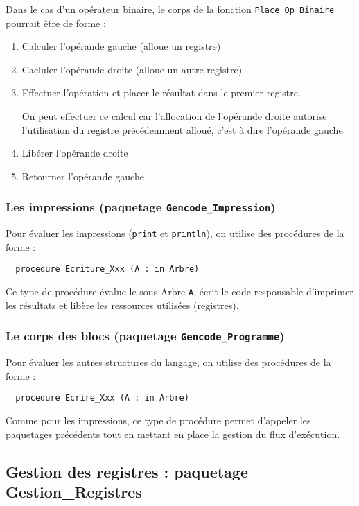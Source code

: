 Dans le cas d'un opérateur binaire, le corps de la fonction \verb!Place_Op_Binaire! pourrait être de forme :
\begin{enumerate}
\item Calculer l'opérande gauche (alloue un registre)
\item Cacluler l'opérande droite (alloue un autre registre)
\item Effectuer l'opération et placer le résultat dans le premier registre.

  On peut effectuer ce calcul car l'allocation de l'opérande droite autorise l'utilisation du registre précédemment alloué, c'est à dire l'opérande gauche.
\item Libérer l'opérande droite
\item Retourner l'opérande gauche
\end{enumerate}


\subsubsection{Les impressions (paquetage \texttt{Gencode\_Impression})}

Pour évaluer les impressions (\verb!print! et \verb!println!), on utilise des procédures de la forme :
\begin{verbatim}
  procedure Ecriture_Xxx (A : in Arbre)
\end{verbatim}
Ce type de procédure évalue le sous-Arbre \verb!A!, écrit le code responsable d'imprimer les résultats et libère les ressources utilisées (registres).

\subsubsection{Le corps des blocs (paquetage \texttt{Gencode\_Programme})}

Pour évaluer les autres structures du langage, on utilise des procédures de la forme :
\begin{verbatim}
  procedure Ecrire_Xxx (A : in Arbre)
\end{verbatim}
Comme pour les impressions, ce type de procédure permet d'appeler les paquetages précédents tout en mettant en place la gestion du flux d'exécution.

\subsection{Gestion des registres : paquetage Gestion\_Registres}
\label{registres}

